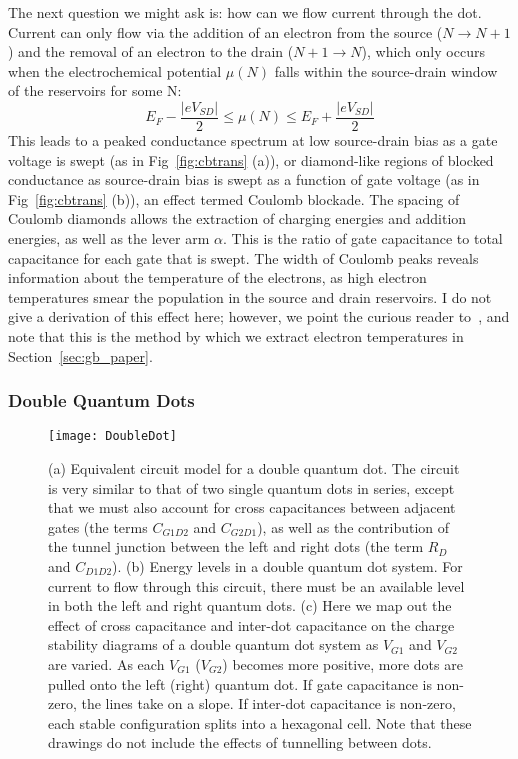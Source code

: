 The next question we might ask is: how can we flow current through the dot. Current can only flow via the addition of an electron
from the source ($N \rightarrow N+1$) and the removal of an electron to the drain ($N+1 \rightarrow N$), which only occurs
when the electrochemical potential $\mu(N)$ falls within the source-drain window of the reservoirs for some N:
\begin{equation}
  E_F - \frac{|eV_{SD}|}{2} \leq \mu(N) \leq E_F + \frac{|eV_{SD}|}{2}
\end{equation}
This leads to a peaked conductance spectrum at low source-drain bias as a gate voltage is swept (as in Fig~\ref{fig:cbtrans} (a)), or
diamond-like regions of blocked conductance as source-drain bias is swept as a function of gate voltage (as in Fig~\ref{fig:cbtrans} (b)),
an effect termed Coulomb blockade. The spacing of Coulomb diamonds allows the extraction of charging energies and addition energies, as
well as the lever arm $\alpha$. This is the ratio of gate capacitance to total capacitance for each gate that is swept. The width of Coulomb
peaks reveals information about the temperature of the electrons, as high electron temperatures smear the population in
the source and drain reservoirs. I do not give a derivation of this effect here; however, we point the curious reader to~\cite{grabert2013single},
and note that this is the method by which we extract electron temperatures in Section~\ref{sec:gb_paper}.

\subsubsection{Double Quantum Dots}
\begin{figure}
  \texttt{[image: DoubleDot]}
  \caption[Schematic of a double quantum dot]
  {\label{fig:dqd}(a) Equivalent circuit model for a double quantum dot. The circuit is very similar to that of
  two single quantum dots in series, except that we must also account for cross capacitances between adjacent gates
  (the terms $C_{G1D2}$ and $C_{G2D1}$), as well as the contribution of the tunnel junction between the left and
  right dots (the term $R_D$ and $C_{D1D2}$). (b) Energy levels in a double quantum dot system. For current to flow
  through this circuit, there must be an available level in both the left and right quantum dots. (c) Here we map
  out the effect of cross capacitance and inter-dot capacitance on the charge stability diagrams of a double quantum
  dot system as $V_{G1}$ and $V_{G2}$ are varied. As each $V_{G1}$ ($V_{G2}$) becomes more positive, more dots are
  pulled onto the left (right) quantum dot. If gate capacitance is non-zero, the lines take on a slope. If inter-dot
  capacitance is non-zero, each stable configuration splits into a hexagonal cell. Note that these drawings do
  not include the effects of tunnelling between dots.}
\end{figure}


